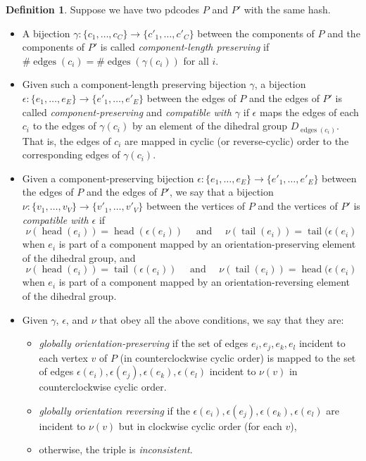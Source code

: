 \documentclass[amsmath,secnumarabic,floatfix,amssymb,nofootinbib,nobibnotes,letterpaper,11pt,tightenlines,showkeys]{revtex4}
\theoremstyle{definition}
\newtheorem{definition}[theorem]{Definition}
\newcommand{\edges}{\operatorname{edges}}
\newcommand{\head}{\operatorname{head}}
\newcommand{\tail}{\operatorname{tail}}
\begin{document}
\begin{definition}
Suppose we have two pdcodes $P$ and $P'$ with the same hash.
\begin{itemize}
\item A bijection $\gamma: \{c_1,\dots,c_C\} \rightarrow \{c'_1,\dots,c'_C\}$ between the components of $P$ and the components of $P'$ is called \emph{component-length preserving} if $\# \edges(c_i) = \# \edges(\gamma(c_i))$ for all $i$.
\item Given such a component-length preserving bijection $\gamma$, a bijection $\epsilon : \{e_1,\dots,e_E\} \rightarrow \{e'_1,\dots,e'_E\}$ between the edges of $P$ and the edges of $P'$ is called \emph{component-preserving} and \emph{compatible with $\gamma$} if $\epsilon$ maps the edges of each $c_i$ to the edges of $\gamma(c_i)$ by an element of the dihedral group $D_{\edges(c_i)}$. That is, the edges of $c_i$ are mapped in cyclic (or reverse-cyclic) order to the corresponding edges of $\gamma(c_i)$.
\item Given a component-preserving bijection $\epsilon : \{e_1,\dots,e_E\} \rightarrow \{e'_1,\dots,e'_E\}$ between the edges of $P$ and the edges of $P'$, we say that a bijection $\nu : \{v_1, \dots, v_V\} \rightarrow \{v'_1,\dots,v'_V\}$ between the vertices of $P$ and the vertices of $P'$ is \emph{compatible with $\epsilon$} if
\begin{equation*}
\nu(\head(e_i)) = \head(\epsilon(e_i)) \quad \text{ and } \quad \nu(\tail(e_i)) = \tail(\epsilon(e_i)
\end{equation*}
when $e_i$ is part of a component mapped by an orientation-preserving element of the dihedral group, and
\begin{equation*}
\nu(\head(e_i)) = \tail(\epsilon(e_i)) \quad \text{ and } \quad \nu(\tail(e_i)) = \head(\epsilon(e_i)
\end{equation*}
when $e_i$ is part of a component mapped by an orientation-reversing element of the dihedral group.
\item Given $\gamma$, $\epsilon$, and $\nu$ that obey all the above conditions, we say that they are:
\begin{itemize}
 \item \emph{globally orientation-preserving} if the set of edges $e_i, e_j, e_k, e_l$ incident to each vertex $v$ of $P$ (in counterclockwise cyclic order) is mapped to the set of edges $\epsilon(e_i), \epsilon(e_j), \epsilon(e_k), \epsilon(e_l)$ incident to $\nu(v)$ in counterclockwise cyclic order.
 \item \emph{globally orientation reversing} if the $\epsilon(e_i), \epsilon(e_j), \epsilon(e_k), \epsilon(e_l)$ are incident to $\nu(v)$ but in clockwise cyclic order (for each $v$),
 \item otherwise, the triple is \emph{inconsistent}.
\end{itemize}
\end{itemize}
\end{definition}
\end{document}
